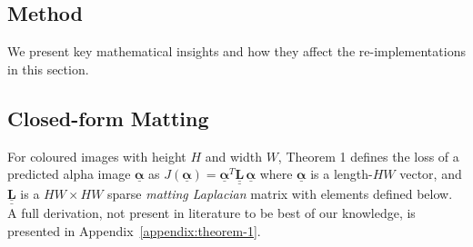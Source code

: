 \documentclass{article}
\theoremstyle{definition}
\def\vt#1{\underline{\mathbf{#1}}}
\def\vts#1{\underline{\boldsymbol{#1}}}
\def\mt#1{\underline{\underline{\mathbf{#1}}}}
\begin{document}
\begin{multicols}{2}[]


\section{Method}


We present key mathematical insights and how they affect the re-implementations in this section.

\subsection{Closed-form Matting}\label{s3-closed-form-matting}

For coloured images with height $H$ and width $W$, %
Theorem 1 \cite{closed-form-matting} defines the loss of a predicted alpha image $\vts \alpha$ as $ J(\vts \alpha) = \vts \alpha^T \mt L\, \vts \alpha$ where $\vts \alpha$ is a length-$HW$ vector, and $\mt L$ is a $HW\times HW$ sparse \emph{matting Laplacian} matrix with elements defined below. A full derivation, not present in literature to be best of our knowledge, is presented in Appendix~\ref{appendix:theorem-1}.


\end{multicols}
\end{document}
